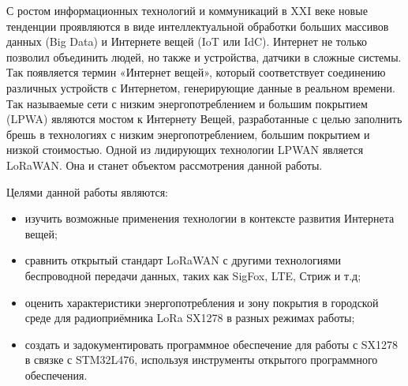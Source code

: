 \Introduction

С ростом информационных технологий и коммуникаций в XXI веке новые тенденции проявляются в виде интеллектуальной обработки больших массивов данных (Big Data) и Интернете вещей (IoT или IdC). 
Интернет не только позволил объединить людей, но также и устройства, датчики в сложные системы. 
Так появляется термин «Интернет вещей», который соответствует соединению различных устройств с Интернетом, генерирующие данные в реальном времени. 
Так называемые сети с низким энергопотреблением и большим покрытием (LPWA) являются мостом к Интернету Вещей, разработанные с целью заполнить брешь в технологиях с низким энергопотреблением, большим покрытием и низкой стоимостью. 
Одной из лидирующих технологии LPWAN является LoRaWAN. Она и станет объектом рассмотрения данной работы.

Целями данной работы являются:


\begin{itemize}
	\item изучить возможные применения технологии в контексте развития Интернета вещей;
	\item сравнить открытый стандарт LoRaWAN с другими технологиями беспроводной передачи данных, таких как SigFox, LTE, Стриж и т.д;
	\item оценить характеристики энергопотребления и зону покрытия в городской среде для радиоприёмника LoRa SX1278 в разных режимах работы;
	\item создать и задокументировать программное обеспечение для работы с SX1278 в связке с STM32L476, используя инструменты открытого программного обеспечения.
\end{itemize}


